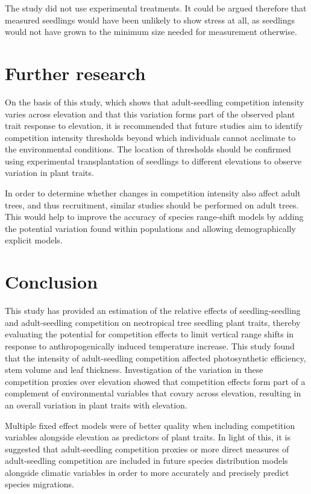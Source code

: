 \documentclass[a4paper, 11pt]{article}
\begin{document}
The study did not use experimental treatments. It could be argued therefore that measured seedlings would have been unlikely to show stress at all, as seedlings would not have grown to the minimum size needed for measurement otherwise.

\section{Further research}
On the basis of this study, which shows that adult-seedling competition intensity varies across elevation and that this variation forms part of the observed plant trait response to elevation, it is recommended that future studies aim to identify competition intensity thresholds beyond which individuals cannot acclimate to the environmental conditions. The location of thresholds should be confirmed using experimental transplantation of seedlings to different elevations to observe variation in plant traits.

In order to determine whether changes in competition intensity also affect adult trees, and thus recruitment, similar studies should be performed on adult trees. This would help to improve the accuracy of species range-shift models by adding the potential variation found within populations and allowing demographically explicit models.

\section*{Conclusion}

This study has provided an estimation of the relative effects of seedling-seedling and adult-seedling competition on neotropical tree seedling plant traits, thereby evaluating the potential for competition effects to limit vertical range shifts in response to anthropogenically induced temperature increase. This study found that the intensity of adult-seedling competition affected photosynthetic efficiency, stem volume and leaf thickness. Investigation of the variation in these competition proxies over elevation showed that competition effects form part of a complement of environmental variables that covary across elevation, resulting in an overall variation in plant traits with elevation.

Multiple fixed effect models were of better quality when including competition variables alongside elevation as predictors of plant traits. In light of this, it is suggested that adult-seedling competition proxies or more direct measures of adult-seedling competition are included in future species distribution models alongside climatic variables in order to more accurately and precisely predict species migrations.
\end{document}
